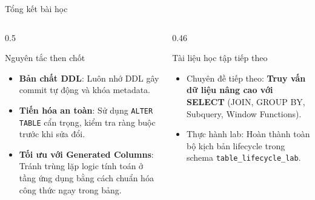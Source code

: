 \documentclass[aspectratio=169,11pt]{beamer}
\newcommand{\kw}[1]{\textcolor{dbblue}{\textbf{#1}}}
\begin{document}
\begin{frame}{Tổng kết bài học}
\begin{columns}[t]
  \begin{column}{0.5\textwidth}
    \begin{block}{Nguyên tắc then chốt}
      \begin{itemize}\setlength{\itemsep}{2pt}
        \item \kw{Bản chất DDL}: Luôn nhớ DDL gây commit tự động và khóa metadata.
        \item \kw{Tiến hóa an toàn}: Sử dụng \texttt{ALTER TABLE} cẩn trọng, kiểm tra ràng buộc trước khi sửa đổi.
        \item \kw{Tối ưu với Generated Columns}: Tránh trùng lặp logic tính toán ở tầng ứng dụng bằng cách chuẩn hóa công thức ngay trong bảng.
      \end{itemize}
    \end{block}
  \end{column}
  \begin{column}{0.46\textwidth}
    \begin{exampleblock}{Tài liệu học tập tiếp theo}
      \begin{itemize}\setlength{\itemsep}{2pt}
        \item Chuyên đề tiếp theo: \textbf{Truy vấn dữ liệu nâng cao với SELECT} (JOIN, GROUP BY, Subquery, Window Functions).
        \item Thực hành lab: Hoàn thành toàn bộ kịch bản lifecycle trong schema \texttt{table\_lifecycle\_lab}.
      \end{itemize}
    \end{exampleblock}
  \end{column}
\end{columns}
\end{frame}
\end{document}
